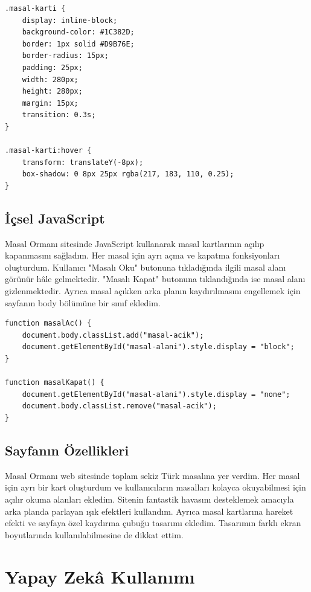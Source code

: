 \documentclass[12pt,a4paper]{article}
\begin{document}
\begin{lstlisting}[caption={İçsel CSS'ten önemli bir bölüm}]
.masal-karti {
    display: inline-block;
    background-color: #1C382D;
    border: 1px solid #D9B76E;
    border-radius: 15px;
    padding: 25px;
    width: 280px;
    height: 280px;
    margin: 15px;
    transition: 0.3s;
}

.masal-karti:hover {
    transform: translateY(-8px);
    box-shadow: 0 8px 25px rgba(217, 183, 110, 0.25);
}
\end{lstlisting}

\subsection{İçsel JavaScript}
Masal Ormanı sitesinde JavaScript kullanarak masal kartlarının açılıp kapanmasını sağladım. Her masal için ayrı açma ve kapatma fonksiyonları oluşturdum. Kullanıcı "Masalı Oku" butonuna tıkladığında ilgili masal alanı görünür hâle gelmektedir. "Masalı Kapat" butonuna tıklandığında ise masal alanı gizlenmektedir. Ayrıca masal açıkken arka planın kaydırılmasını engellemek için sayfanın body bölümüne bir sınıf ekledim.

\begin{lstlisting}[caption={İçsel JavaScript'ten önemli bir bölüm}]
function masalAc() {
    document.body.classList.add("masal-acik");
    document.getElementById("masal-alani").style.display = "block";
}

function masalKapat() {
    document.getElementById("masal-alani").style.display = "none";
    document.body.classList.remove("masal-acik");
}
\end{lstlisting}

\subsection{Sayfanın Özellikleri}
Masal Ormanı web sitesinde toplam sekiz Türk masalına yer verdim. Her masal için ayrı bir kart oluşturdum ve kullanıcıların masalları kolayca okuyabilmesi için açılır okuma alanları ekledim. Sitenin fantastik havasını desteklemek amacıyla arka planda parlayan ışık efektleri kullandım. Ayrıca masal kartlarına hareket efekti ve sayfaya özel kaydırma çubuğu tasarımı ekledim. Tasarımın farklı ekran boyutlarında kullanılabilmesine de dikkat ettim.

\section{Yapay Zekâ Kullanımı}
\end{document}
